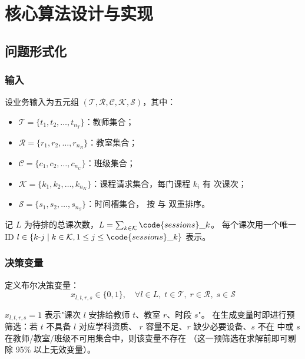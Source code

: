 ﻿%
\section{核心算法设计与实现}

\subsection{问题形式化}

\subsubsection{输入}

设业务输入为五元组 $(\mathcal{T}, \mathcal{R}, \mathcal{C}, \mathcal{K}, \mathcal{S})$，其中：
\begin{itemize}[leftmargin=2em,itemsep=0.1em]
\item $\mathcal{T} = \{t_1, t_2, \ldots, t_{n_T}\}$：教师集合；
\item $\mathcal{R} = \{r_1, r_2, \ldots, r_{n_R}\}$：教室集合；
\item $\mathcal{C} = \{c_1, c_2, \ldots, c_{n_C}\}$：班级集合；
\item $\mathcal{K} = \{k_1, k_2, \ldots, k_{n_K}\}$：课程请求集合，每门课程
$k_i$ 有  次课次；
\item $\mathcal{S} = \{s_1, s_2, \ldots, s_{n_S}\}$：时间槽集合，
按  与  双重排序。
\end{itemize}

记 $L$ 为待排的总课次数，$L = \sum_{k \in \mathcal{K}} \code{sessions}\_k$。
每个课次用一个唯一 ID $l \in \{k\text{-}j \mid k \in \mathcal{K},
1 \le j \le \code{sessions}\_k\}$ 表示。

\subsubsection{决策变量}

定义布尔决策变量：
\[
x_{l, t, r, s} \in \{0, 1\}, \quad \forall l \in L,\; t \in \mathcal{T},\;
r \in \mathcal{R},\; s \in \mathcal{S}
\]

$x_{l, t, r, s} = 1$ 表示"课次 $l$ 安排给教师 $t$、教室 $r$、时段 $s$"。
在生成变量时即进行预筛选：若 $t$ 不具备 $l$ 对应学科资质、
$r$ 容量不足、$r$ 缺少必要设备、$s$ 不在 
中或 $s$ 在教师/教室/班级不可用集合中，则该变量不存在
（这一预筛选在求解前即可剔除 95\% 以上无效变量）。

